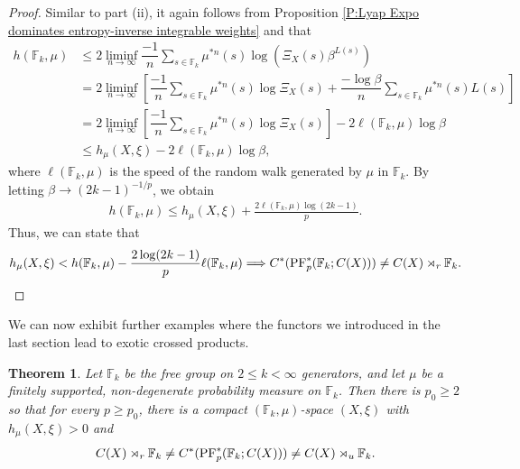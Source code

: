\documentclass[12pt]{amsart}
\newtheorem{thm}{Theorem}[section]
\theoremstyle{definition}
\theoremstyle{remark}
\numberwithin{equation}{section}
\newcommand{\F}{\mathbb{F}}
\newcommand{\cpff}{\rtimes_{\textup{PF}_p} \F_k}
\begin{document}
\begin{proof}
Similar to part (ii), it again follows from Proposition \ref{P:Lyap Expo dominates entropy-inverse integrable weights} and \cite[Theorem 3.7]{ASdLSS1} that
\begin{align*}%
h(\F_k,\mu)& \leq 2\liminf_{n\rightarrow \infty}\dfrac{-1}{n}\sum_{s\in \F_k}\mu^{*n}(s) \log \left(\Xi_X(s) \beta^{L(s)}\right) \\
& = 2\liminf_{n\rightarrow \infty}\left[\dfrac{-1}{n}\sum_{s\in \F_k}\mu^{*n}(s) \log \Xi_X(s) +\dfrac{-\log \beta}{n}\sum_{s\in \F_k}\mu^{*n}(s) L(s)\right] \\
&= 2\liminf_{n\rightarrow \infty}\left[\dfrac{-1}{n}\sum_{s\in \F_k}\mu^{*n}(s)\log \Xi_X(s)\right]- 2\ell(\F_k,\mu) \log \beta \\
&\leq h_\mu(X,\xi)- 2\ell(\F_k,\mu) \log \beta,
\end{align*}
where $\ell(\F_k,\mu)$ is  the speed of the random walk generated by $\mu$ in $\F_k$. By letting $\beta \to (2k-1)^{-1/p}$, we obtain
\begin{align}%
h(\F_k,\mu)\leq h_\mu(X,\xi)+ \frac{2\ell(\F_k,\mu) \log (2k-1)}{p}.
\end{align}
Thus, we can state that
\begin{align}\label{Eq:2}
   h_\mu(X,\xi)<  h(\F_k,\mu)-\frac{2\log (2k-1)}{p}\ell(\F_k,\mu) \Longrightarrow C^*(\textup{PF}^*_p(\F_k;C(X))) \neq C(X)\rtimes_r \F_k.
\end{align}
\end{proof}

We can now exhibit further examples where the functors we introduced in the last section lead to exotic crossed products.

\begin{thm}\label{T:nontrivial PF_p cross C* alg using entropy}
    Let $\F_k$ be the free group on $2\le k < \infty$ generators, and let $\mu$ be a finitely supported, non-degenerate probability measure on $\F_k$. Then there is $p_0\geq 2$ so that for every $p\geq p_0$, there is a compact $(\F_k,\mu)$-space $(X,\xi)$ with $h_\mu(X,\xi)>0$ and
    \begin{align*}
        C(X)\rtimes_r \F_k\neq C^*(\textup{PF}^*_p(\F_k;C(X))) \neq C(X)\rtimes_u \F_k.
    \end{align*}
\end{thm}
\end{document}
